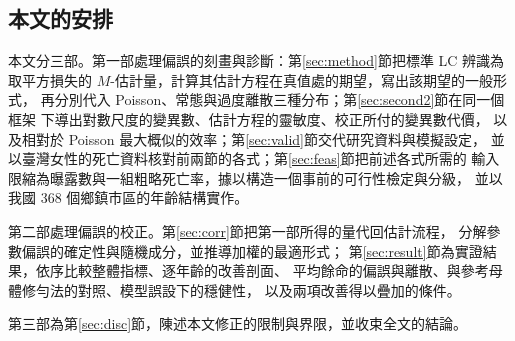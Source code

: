 \subsection{本文的安排}\label{sec:roadmap}

本文分三部。第一部處理偏誤的刻畫與診斷：第\ref{sec:method}節把標準 LC 辨識為
取平方損失的 $M$-估計量，計算其估計方程在真值處的期望，寫出該期望的一般形式，
再分別代入 Poisson、常態與過度離散三種分布；第\ref{sec:second2}節在同一個框架
下導出對數尺度的變異數、估計方程的靈敏度、校正所付的變異數代價，
以及相對於 Poisson 最大概似的效率；第\ref{sec:valid}節交代研究資料與模擬設定，
並以臺灣女性的死亡資料核對前兩節的各式；第\ref{sec:feas}節把前述各式所需的
輸入限縮為曝露數與一組粗略死亡率，據以構造一個事前的可行性檢定與分級，
並以我國 368 個鄉鎮市區的年齡結構實作。

第二部處理偏誤的校正。第\ref{sec:corr}節把第一部所得的量代回估計流程，
分解參數偏誤的確定性與隨機成分，並推導加權的最適形式；
第\ref{sec:result}節為實證結果，依序比較整體指標、逐年齡的改善剖面、
平均餘命的偏誤與離散、與參考母體修勻法的對照、模型誤設下的穩健性，
以及兩項改善得以疊加的條件。

第三部為第\ref{sec:disc}節，陳述本文修正的限制與界限，並收束全文的結論。

